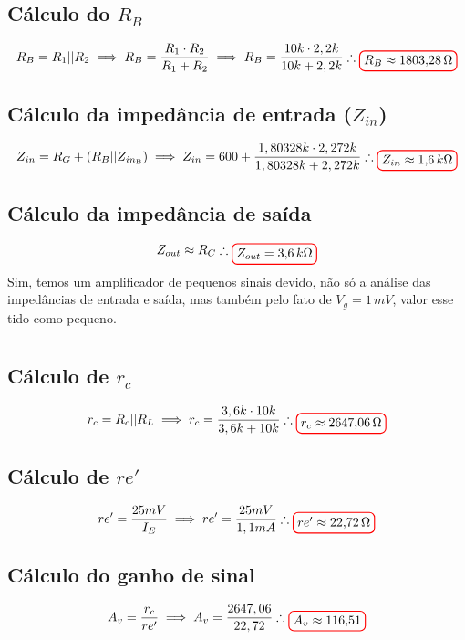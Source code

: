 \documentclass[12pt,openany,oneside,a4paper]{abntex2}
\begin{document}
\subsection{Cálculo do $R_{B}$}
\[
R_{B} = R_{1} || R_{2} \implies R_{B} = \frac{R_{1} \cdot R_{2}}{R_{1} + R_{2}} \implies R_{B} = \frac{10k \cdot 2,2k}{10k + 2,2k} \therefore \tikz[baseline]{\node[draw=red, thick, rounded corners] {$R_{B} \approx 1803{,}28\,\Omega$};}
\]

\subsection{Cálculo da impedância de entrada ($Z_{in}$)}
\[
Z_{in} = R_{G} + (R_{B} || Z_{in_{\text{B}}}) \implies Z_{in} = 600 + \frac{1,80328k \cdot 2,272k}{1,80328k + 2,272k} \therefore \tikz[baseline]{\node[draw=red, thick, rounded corners] {$Z_{in} \approx 1{,}6\,k\Omega$};}
\]

\subsection{Cálculo da impedância de saída}
\[
Z_{out} \approx R_{C} \therefore \tikz[baseline]{\node[draw=red, thick, rounded corners] {$Z_{out} = 3{,}6\,k\Omega$};}
\]Sim, temos um amplificador de pequenos sinais devido, não só a análise das impedâncias de entrada e saída, mas também pelo fato de $V_{g} = 1\,mV$, valor esse tido como pequeno.

\section{}

\subsection{Cálculo de $r_{c}$}
\[
r_{c} = R_{c} || R_{L} \implies r_{c} = \frac{3,6k \cdot 10k}{3,6k + 10k} \therefore \tikz[baseline]{\node[draw=red, thick, rounded corners] {$r_{c} \approx 2647{,}06\,\Omega$};}
\]

\subsection{Cálculo de $re'$}
\[
re' = \frac{25mV}{I_{E}} \implies re' = \frac{25mV}{1,1mA} \therefore \tikz[baseline]{\node[draw=red, thick, rounded corners] {$re' \approx 22{,}72\,\Omega$};}
\]

\subsection{Cálculo do ganho de sinal}
\[
A_{v} = \frac{r_{c}}{re'} \implies A_{v} = \frac{2647,06}{22,72} \therefore \tikz[baseline]{\node[draw=red, thick, rounded corners] {$A_{v} \approx 116{,}51$};}
\]
\end{document}
